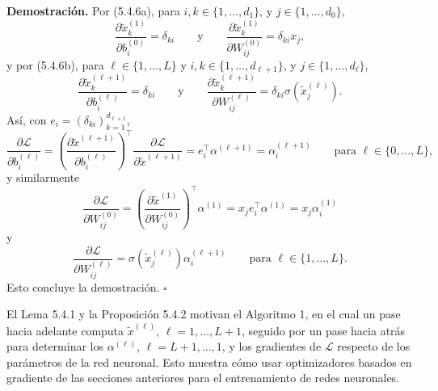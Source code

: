 \documentclass[11pt]{report}
\theoremstyle{definition}
\theoremstyle{plain}
\numberwithin{equation}{section}
\begin{document}
\textbf{Demostración.} Por (5.4.6a), para \(i,k\in\{1,\ldots,d_1\}\), y \(j\in\{1,\ldots,d_0\}\),
\begin{equation*}
    \frac{\partial\widetilde{x}_k^{(1)}}{\partial b_i^{(0)}}
    =
    \delta_{ki}
    \qquad
    \text{y}
    \qquad
    \frac{\partial\widetilde{x}_k^{(1)}}{\partial W_{ij}^{(0)}}
    =
    \delta_{ki}x_j,
\end{equation*}
y por (5.4.6b), para \(\ell\in\{1,\ldots,L\}\) y \(i,k\in\{1,\ldots,d_{\ell+1}\}\), y \(j\in\{1,\ldots,d_\ell\}\),
\begin{equation*}
    \frac{\partial\widetilde{x}_k^{(\ell+1)}}{\partial b_i^{(\ell)}}
    =
    \delta_{ki}
    \qquad
    \text{y}
    \qquad
    \frac{\partial\widetilde{x}_k^{(\ell+1)}}{\partial W_{ij}^{(\ell)}}
    =
    \delta_{ki}\sigma(\widetilde{x}_j^{(\ell)}).
\end{equation*}
Así, con \(e_i=(\delta_{ki})_{k=1}^{d_{\ell+1}}\),
\begin{equation*}
    \frac{\partial\mathcal{L}}{\partial b_i^{(\ell)}}
    =
    \left(
        \frac{\partial\widetilde{x}^{(\ell+1)}}{\partial b_i^{(\ell)}}
    \right)^\top
    \frac{\partial\mathcal{L}}{\partial\widetilde{x}^{(\ell+1)}}
    =
    e_i^\top\alpha^{(\ell+1)}
    =
    \alpha_i^{(\ell+1)}
    \qquad
    \text{para } \ell\in\{0,\ldots,L\},
\end{equation*}
y similarmente
\begin{equation*}
    \frac{\partial\mathcal{L}}{\partial W_{ij}^{(0)}}
    =
    \left(
        \frac{\partial\widetilde{x}^{(1)}}{\partial W_{ij}^{(0)}}
    \right)^\top
    \alpha^{(1)}
    =
    x_je_i^\top\alpha^{(1)}
    =
    x_j\alpha_i^{(1)}
\end{equation*}
y
\begin{equation*}
    \frac{\partial\mathcal{L}}{\partial W_{ij}^{(\ell)}}
    =
    \sigma(\widetilde{x}_j^{(\ell)})
    \alpha_i^{(\ell+1)}
    \qquad
    \text{para } \ell\in\{1,\ldots,L\}.
\end{equation*}
Esto concluye la demostración. \(\square\)

El Lema 5.4.1 y la Proposición 5.4.2 motivan el Algoritmo 1, en el cual un pase hacia adelante computa \(\widetilde{x}^{(\ell)}\), \(\ell=1,\ldots,L+1\), seguido por un pase hacia atrás para determinar los \(\alpha^{(\ell)}\), \(\ell=L+1,\ldots,1\), y los gradientes de \(\mathcal{L}\) respecto de los parámetros de la red neuronal. Esto muestra cómo usar optimizadores basados en gradiente de las secciones anteriores para el entrenamiento de redes neuronales.
\end{document}

